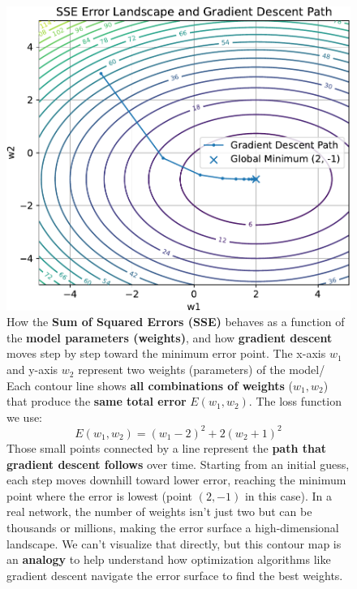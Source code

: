 \begin{figure}[!htp]
    \centering
    \includegraphics[width=.85\textwidth]{img/learning-and-optimization/error-geometric-interpretation-1.pdf}
    \captionsetup{singlelinecheck=off}
    \caption[]{How the \textbf{Sum of Squared Errors (SSE)} behaves as a function of the \textbf{model parameters (weights)}, and how \textbf{gradient descent} moves step by step toward the minimum error point. The x-axis $w_{1}$ and y-axis $w_{2}$ represent two weights (parameters) of the model/ Each contour line shows \textbf{all combinations of weights} ($w_{1}, w_{2}$) that produce the \textbf{same total error} $E(w_{1}, w_{2})$. The loss function we use:
    \begin{equation*}
        E\left(w_1, w_2\right) = \left(w_1 - 2\right)^2 + 2\left(w_2 + 1\right)^2
    \end{equation*}
    Those small points connected by a line represent the \textbf{path that gradient descent follows} over time. Starting from an initial guess, each step moves downhill toward lower error, reaching the minimum point where the error is lowest (point $(2, -1)$ in this case). In a real network, the number of weights isn't just two but can be thousands or millions, making the error surface a high-dimensional landscape. We can't visualize that directly, but this contour map is an \textbf{analogy} to help understand how optimization algorithms like gradient descent navigate the error surface to find the best weights.}
    \label{fig:error-geometric-interpretation-1}
\end{figure}

\newpage

